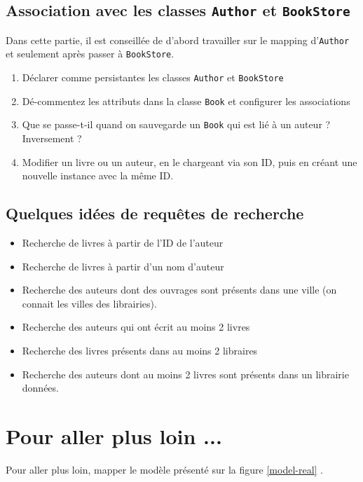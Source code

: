 \documentclass[small,algo]{dushClass}
\begin{document}
\subsection{Association avec les classes \texttt{Author} et \texttt{BookStore}}

Dans cette partie, il est conseillée de d'abord travailler sur le mapping d'\texttt{Author} et seulement après passer à \texttt{BookStore}.\\

\begin{enumerate}
\item Déclarer comme persistantes les classes \texttt{Author} et \texttt{BookStore}
\item Dé-commentez les attributs dans la classe \texttt{Book} et configurer les associations
\item Que se passe-t-il quand on sauvegarde un \texttt{Book} qui est lié à un auteur ? Inversement ?
\item Modifier un livre ou un auteur, en le chargeant via son ID, puis en créant une nouvelle instance avec la même ID.
\end{enumerate}

\subsection{Quelques idées de requêtes de recherche}
\begin{itemize}
\item Recherche de livres à partir de l'ID de l'auteur
\item Recherche de livres à partir d'un nom d'auteur
\item Recherche des auteurs dont des ouvrages sont présents dans une ville (on connait les villes des librairies).
\item Recherche des auteurs qui ont écrit au moins 2 livres
\item Recherche des livres présents dans au moins 2 libraires
\item Recherche des auteurs dont au moins 2 livres sont présents dans un librairie données.
\end{itemize}


\section{Pour aller plus loin ...}
Pour aller plus loin, mapper le modèle présenté sur la figure \ref{model-real} .\\
\end{document}
